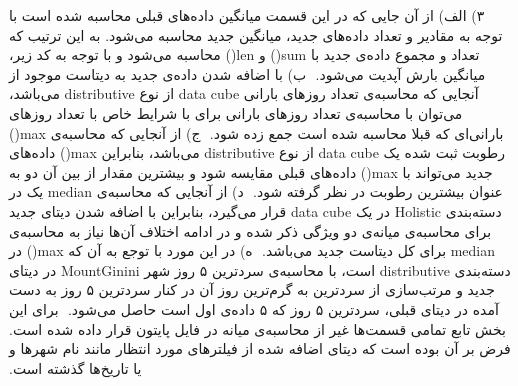 ‫
‫\vspace{1cm}
‫
‫۳) الف) از آن جایی که در این قسمت میانگین داده‌های قبلی محاسبه شده است با توجه به مقادیر و تعداد داده‌های جدید، میانگین جدید محاسبه می‌‌شود. به این ترتیب که تعداد و مجموع داده‌ی جدید با sum() و len() محاسبه ‌می‌شود و با توجه به کد زیر، میانگین بارش آپدیت می‌شود. \newline
‫
‫ب) با اضافه شدن داده‌ی جدید به دیتاست موجود از آنجایی که محاسبه‌ی تعداد روزهای بارانی data cube از نوع distributive می‌باشد، می‌توان با محاسبه‌ی تعداد روزهای بارانی برای با شرایط خاص با تعداد روزهای بارانی‌ای که قبلا محاسبه شده است جمع زده شود. \newline
‫
‫ج) از آنجایی که محاسبه‌ی max() رطوبت ثبت شده یک data cube از نوع distributive می‌باشد، بنابراین max() داده‌های جدید می‌تواند با max() داده‌های قبلی مقایسه شود و بیشترین مقدار از بین آن دو به عنوان بیشترین رطوبت در نظر گرفته شود. \newline
‫
‫د) از آنجایی که محاسبه‌ی median یک در دسته‌بندی Holistic در یک data cube قرار می‌گیرد، بنابراین با اضافه شدن دیتای جدید برای محاسبه‌ی میانه‌ی دو ویژگی ذکر شده و در ادامه اختلاف آن‌ها نیاز به محاسبه‌ی median برای کل دیتاست جدید می‌باشد. \newline
‫
‫ه) در این مورد با توجع به آن که max() در دسته‌بندی distributive است، با محاسبه‌ی سردترین ۵ روز شهر MountGinini در دیتای جدید و مرتب‌ساز‌ی از سردترین به گرم‌ترین روز آن در کنار سردترین ۵ روز به دست آمده در دیتای قبلی، سردترین ۵ روز که ۵ داده‌ی اول است حاصل می‌شود. \newline
‫
‫برای این بخش تابع تمامی قسمت‌ها غیر از محاسبه‌ی میانه در فایل پایتون قرار داده شده است. فرض بر آن بوده است که دیتای اضافه شده از فیلترهای مورد انتظار مانند نام شهرها و یا تاریخ‌ها گذشته است.
